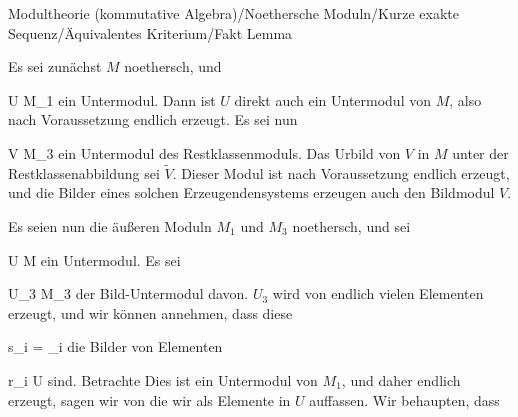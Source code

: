 {Modultheorie (kommutative Algebra)/Noethersche Moduln/Kurze exakte Sequenz/Äquivalentes Kriterium/Fakt}
{Lemma}
{}
{



\faktsituation {}
\faktzusatz {}
\faktzusatz {}





}
{





Es sei zunächst $M$ noethersch, und

\mavergleichskette
{\vergleichskette
{ U
}
{ \subseteq }{ M_1
}
{  }{
}
{    }{
}
{   }{
}
}
{}{}{}
ein Untermodul. Dann ist $U$ direkt auch ein Untermodul von $M$, also nach Voraussetzung endlich erzeugt. Es sei nun

\mavergleichskette
{\vergleichskette
{ V
}
{ \subseteq }{ M_3
}
{  }{
}
{    }{
}
{   }{
}
}
{}{}{}
ein Untermodul des Restklassenmoduls. Das Urbild von $V$ in $M$ unter der Restklassenabbildung sei $\tilde{V}$. Dieser Modul ist nach Voraussetzung endlich erzeugt, und die Bilder eines solchen Erzeugendensystems erzeugen auch den Bildmodul $V$.

Es seien nun die äußeren Moduln $M_1$ und $M_3$ noethersch, und sei

\mavergleichskette
{\vergleichskette
{ U
}
{ \subseteq }{ M
}
{  }{
}
{    }{
}
{   }{
}
}
{}{}{}
ein Untermodul. Es sei

\mavergleichskette
{\vergleichskette
{ U_3
}
{ \subseteq }{ M_3
}
{  }{
}
{    }{
}
{   }{
}
}
{}{}{}
der Bild-Untermodul davon. $U_3$ wird von endlich vielen Elementen
 erzeugt, und wir können annehmen, dass diese

\mavergleichskette
{\vergleichskette
{ s_i
}
{ = }{ _i
}
{  }{
}
{    }{
}
{   }{
}
}
{}{}{}
die Bilder von Elementen

\mavergleichskette
{\vergleichskette
{ r_i
}
{ \in }{ U
}
{  }{
}
{    }{
}
{   }{
}
}
{}{}{}
sind. Betrachte
 Dies ist ein Untermodul von $M_1$, und daher endlich erzeugt, sagen wir von
 die wir als Elemente in $U$ auffassen. Wir behaupten, dass

}
